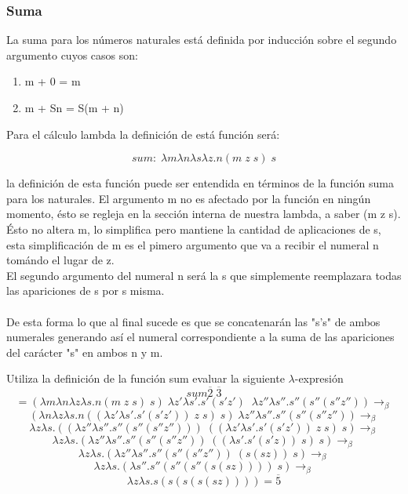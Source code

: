     \subsubsection{Suma}
        La suma para los números naturales está definida por inducción sobre el segundo argumento cuyos casos son:
        \begin{enumerate}
            \item m + 0 = m 
            \item m + Sn = S(m + n)
        \end{enumerate}

        Para el cálculo lambda la definición de está función será:
        \begin{definition}
            $$sum:  \; \lambda m\lambda n\lambda s\lambda z.n(m \; z \; s) \; s$$
        \end{definition}

        la definición de esta función puede ser entendida en términos de la función suma para los naturales. El argumento m no es afectado por la función en ningún momento, ésto se regleja en la sección interna de nuestra lambda, a saber (m z s). Ésto no altera m, lo simplifica pero mantiene la cantidad de aplicaciones de s, esta simplificación de m es el pimero argumento que va a recibir el numeral n tomándo el lugar de z.\\
        El segundo argumento del numeral n será la s que simplemente reemplazara todas las apariciones de s por s misma.\\\\
        De esta forma lo que al final sucede es que se concatenarán las "s's" de ambos numerales generando así el numeral correspondiente a la suma de las apariciones del carácter "s" en ambos n y m.\\


        \begin{exercise}
            Utiliza la definición de la función sum evaluar la siguiente  $\lambda$-expresión
            \[
                sum  \overline{2} \; \overline{3} 
            \]
            \[
                = (\lambda m\lambda n\lambda z\lambda s.n(m \; z \; s) \; s) \; \lambda z'\lambda s'.s'(s'z') \;\; \lambda z''\lambda s''.s''(s''(s''z'')) \rightarrow_\beta 
            \]
            \[
                (\lambda n\lambda z\lambda s.n((\lambda z'\lambda s'.s'(s'z')) \; z \; s) \; s) \; \lambda z''\lambda s''.s''(s''(s''z'')) \rightarrow_\beta 
            \]
            \[
                \lambda z\lambda s.((\lambda z''\lambda s''.s''(s''(s''z''))) \; ((\lambda z'\lambda s'.s'(s'z')) \; z \; s) \; s) \rightarrow_\beta
            \]
            \[
                \lambda z\lambda s.(\lambda z''\lambda s''.s''(s''(s''z'')) \; ((\lambda s'.s'(s'z))  \; s) \; s) \rightarrow_\beta
            \]
            \[
                \lambda z\lambda s.(\lambda z''\lambda s''.s''(s''(s''z'')) \; (s(sz)) \; s) \rightarrow_\beta
            \]
            \[
                \lambda z\lambda s.(\lambda s''.s''(s''(s''(s(sz)))) \; s) \rightarrow_\beta
            \]
            \[
                \lambda z\lambda s.s(s(s(s(sz)))) = \overline{5}
            \]
        \end{exercise}

